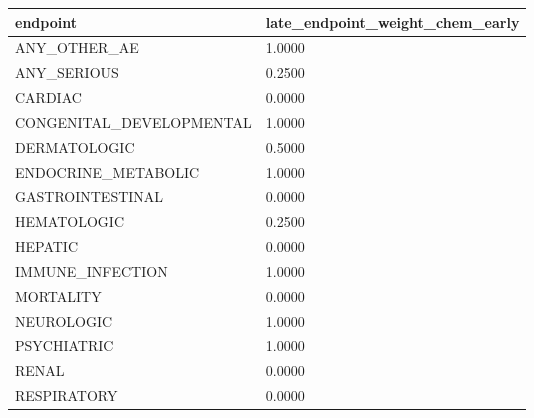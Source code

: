 \begin{tabular}{ll}
\hline
endpoint & late\_endpoint\_weight\_chem\_early \\
\hline
ANY\_OTHER\_AE & 1.0000 \\
ANY\_SERIOUS & 0.2500 \\
CARDIAC & 0.0000 \\
CONGENITAL\_DEVELOPMENTAL & 1.0000 \\
DERMATOLOGIC & 0.5000 \\
ENDOCRINE\_METABOLIC & 1.0000 \\
GASTROINTESTINAL & 0.0000 \\
HEMATOLOGIC & 0.2500 \\
HEPATIC & 0.0000 \\
IMMUNE\_INFECTION & 1.0000 \\
MORTALITY & 0.0000 \\
NEUROLOGIC & 1.0000 \\
PSYCHIATRIC & 1.0000 \\
RENAL & 0.0000 \\
RESPIRATORY & 0.0000 \\
\hline
\end{tabular}
